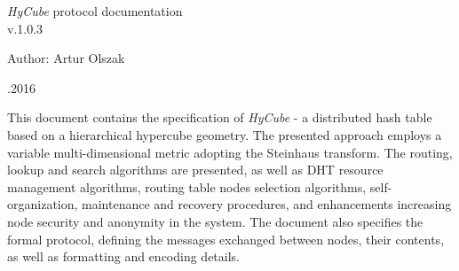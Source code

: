 \documentclass[a4paper,onecolumn,oneside,12pt]{mwrep}
\begin{document}
\begin{titlepage}	%
	
	\fontsize{24pt}{18pt}\selectfont
	\emph{HyCube} protocol documentation \\
	
	\fontsize{16pt}{14pt}\selectfont
	v.1.0.3
	\vspace*{25\baselineskip}
	
	
	\fontsize{14pt}{15pt}\selectfont
	Author: Artur Olszak\\
	\vspace*{1\baselineskip}
	
	
	\begin{flushright}
	\fontsize{10pt}{15pt}.2016
	\end{flushright}
	
\end{titlepage}


\newpage

\newpage
{}


This document contains the specification of \emph{HyCube} - a distributed hash table based on a hierarchical hypercube geometry. The presented approach employs a variable multi-dimensional metric adopting the Steinhaus transform. The routing, lookup and search algorithms are presented, as well as DHT resource management algorithms, routing table nodes selection algorithms, self-organization, maintenance and recovery procedures, and enhancements increasing node security and anonymity in the system. The document also specifies the formal protocol, defining the messages exchanged between nodes, their contents, as well as formatting and encoding details.



\newpage


\setcounter{page}{3}



\tableofcontents


















\nocite{*}





\end{document}
